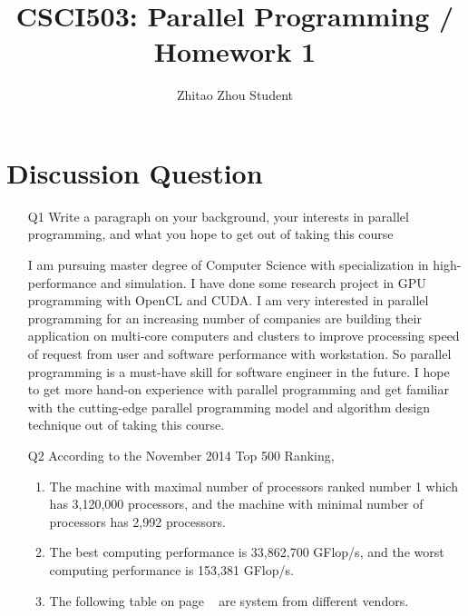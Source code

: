 \documentclass[11pt]{article}
\title{CSCI503: Parallel Programming / Homework 1}
\author{Zhitao Zhou Student}
\begin{document}
\maketitle

\section{Discussion Question}
\begin{enumerate}
\item[Q1]Write a paragraph on your background, your interests in parallel programming, and what you hope to get out of taking this course

I am pursuing master degree of Computer Science with specialization in high-performance and simulation. I have done some research project in GPU programming with OpenCL and CUDA. I am very interested in parallel programming for an increasing number of companies are building their application on multi-core computers and clusters to improve processing speed of request from user and software performance with workstation. So parallel programming is a must-have skill for software engineer in the future. I hope to get more hand-on experience with parallel programming and get familiar with the cutting-edge parallel programming model and algorithm design technique out of taking this course.     
 
\item[Q2]
According to the November 2014 Top 500 Ranking,
\begin{enumerate}
\item The machine with maximal number of processors ranked number 1 which has 3,120,000 processors, and the machine with minimal number of processors has 2,992 processors.
\item The best computing performance is 33,862,700 GFlop/s, and the worst computing performance is 153,381 GFlop/s.
\item 
The following table on page ~\pageref{table:table1} are system from different vendors.


\end{enumerate}
\end{enumerate}
\end{document}
